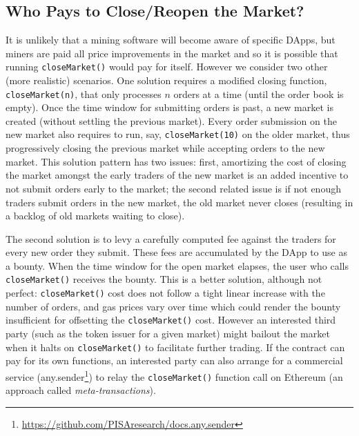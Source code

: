 
\subsection{Who Pays to Close/Reopen the Market?}
\label{sec:close}

It is unlikely that a mining software will become aware of specific DApps, but miners are paid all price improvements in the market and so it is possible that running \texttt{closeMarket()} would pay for itself. However we consider two other (more realistic) scenarios. One solution requires a modified closing function, \texttt{closeMarket(n)}, that only processes $n$ orders at a time (until the order book is empty). Once the time window for submitting orders is past, a new market is created (without settling the previous market). Every order submission on the new market also requires to run, say, \texttt{closeMarket(10)} on the older market, thus progressively closing the previous market while accepting orders to the new market. This solution pattern has two issues: first, amortizing the cost of closing the market amongst the early traders of the new market is an added incentive to not submit orders early to the market; the second related issue is if not enough traders submit orders in the new market, the old market never closes (resulting in a backlog of old markets waiting to close).

The second solution is to levy a carefully computed fee against the traders for every new order they submit. These fees are accumulated by the DApp to use as a bounty. When the time window for the open market elapses, the user who calls \texttt{closeMarket()} receives the bounty. This is a better solution, although not perfect: \texttt{closeMarket()} cost does not follow a tight linear increase with the number of orders, and gas prices vary over time which could render the bounty insufficient for offsetting the \texttt{closeMarket()} cost. However an interested third party (such as the token issuer for a given market) might bailout the market when it halts on \texttt{closeMarket()} to facilitate further trading. If the contract can pay for its own functions, an interested party can also arrange for a commercial service (\eg any.sender\footnote{\url{https://github.com/PISAresearch/docs.any.sender}}) to relay the \texttt{closeMarket()} function call on Ethereum (an approach called \textit{meta-transactions}). 

